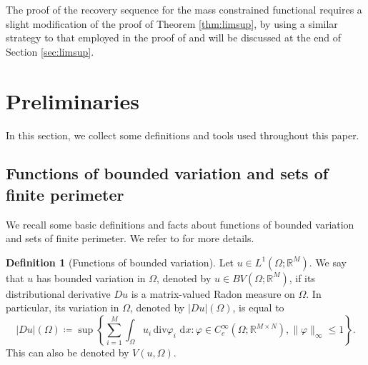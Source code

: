 \documentclass[a4paper, 11pt, reqno]{amsart}
\theoremstyle{plain}
\theoremstyle{definition}
\newtheorem{definition}[theorem]{Definition}
\theoremstyle{remark}
\newcommand{\R}{\mathbb R}
\newcommand{\dd}{\,\mathrm{d}}
\begin{document}
The proof of the recovery sequence for the mass constrained functional requires a slight modification of the proof of Theorem \ref{thm:limsup}, by using a similar strategy to that employed in the proof of \cite[Theorem 15]{cristoferi2025phaseseparationmultiplyperiodic} and will be discussed at the end of Section \ref{sec:limsup}.






\section{Preliminaries}

In this section, we collect some definitions and tools used throughout this paper.

\subsection{Functions of bounded variation and sets of finite perimeter}\label{sec:BV}

We recall some basic definitions and facts about functions of bounded variation and sets of finite perimeter. We refer to \cite{AFP} for more details.

\begin{definition}[Functions of bounded variation] Let $u \in L^1 (\Omega; \R^M)$. We say that $u$ has bounded variation in $\Omega$, denoted by $u \in BV(\Omega; \R^M)$, if its distributional derivative $Du$ is a matrix-valued Radon measure on $\Omega$. In particular, its variation in $\Omega$, denoted by $|Du|(\Omega)$, is equal to 
\begin{equation}
    |Du|(\Omega) \coloneqq \sup \left\{ \sum_{i=1}^M \int_\Omega u_i \, \mathrm{div} \varphi_i \, \dd x : \varphi \in C_c^\infty(\Omega; \R^{M \times N}), \| \varphi \|_\infty \leq 1 \right\}.
\end{equation}
This can also be denoted by $V(u, \Omega)$.
\end{definition}
\end{document}
